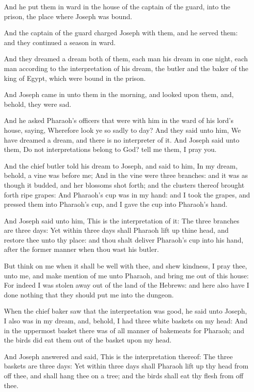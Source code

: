 \verse And he put them in ward in the house of the captain of the guard, into the prison, the place where Joseph was bound.

\verse And the captain of the guard charged Joseph with them, and he served them: and they continued a season in ward.

\verse And they dreamed a dream both of them, each man his dream in one night, each man according to the interpretation of his dream, the butler and the baker of the king of Egypt, which were bound in the prison.

\verse And Joseph came in unto them in the morning, and looked upon them, and, behold, they were sad.

\verse And he asked Pharaoh's officers that were with him in the ward of his lord's house, saying, Wherefore look ye so sadly to day?  \verse And they said unto him, We have dreamed a dream, and there is no interpreter of it. And Joseph said unto them, Do not interpretations belong to God? tell me them, I pray you.

\verse And the chief butler told his dream to Joseph, and said to him, In my dream, behold, a vine was before me; \verse And in the vine were three branches: and it was as though it budded, and her blossoms shot forth; and the clusters thereof brought forth ripe grapes: \verse And Pharaoh's cup was in my hand: and I took the grapes, and pressed them into Pharaoh's cup, and I gave the cup into Pharaoh's hand.

\verse And Joseph said unto him, This is the interpretation of it: The three branches are three days: \verse Yet within three days shall Pharaoh lift up thine head, and restore thee unto thy place: and thou shalt deliver Pharaoh's cup into his hand, after the former manner when thou wast his butler.

\verse But think on me when it shall be well with thee, and shew kindness, I pray thee, unto me, and make mention of me unto Pharaoh, and bring me out of this house: \verse For indeed I was stolen away out of the land of the Hebrews: and here also have I done nothing that they should put me into the dungeon.

\verse When the chief baker saw that the interpretation was good, he said unto Joseph, I also was in my dream, and, behold, I had three white baskets on my head: \verse And in the uppermost basket there was of all manner of bakemeats for Pharaoh; and the birds did eat them out of the basket upon my head.

\verse And Joseph answered and said, This is the interpretation thereof: The three baskets are three days: \verse Yet within three days shall Pharaoh lift up thy head from off thee, and shall hang thee on a tree; and the birds shall eat thy flesh from off thee.

